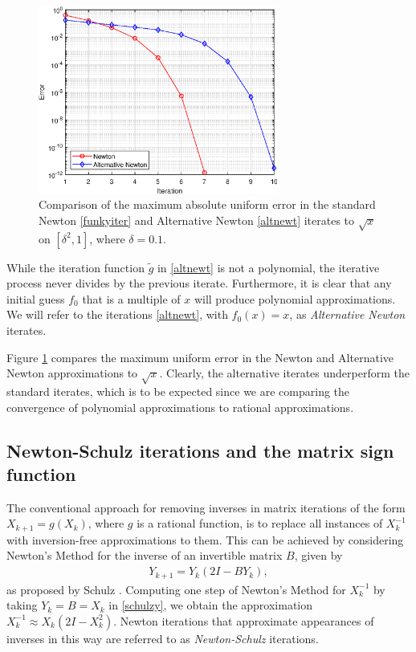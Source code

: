 \begin{figure}[t!]
\centering
   \includegraphics[width=0.7\textwidth,height=0.7\textheight,keepaspectratio]{figures/chapter_2/sqrt_newton_vs_alt.eps}
   \caption{Comparison of the maximum absolute uniform error in the standard Newton \eqref{funkyiter} and Alternative Newton \eqref{altnewt} iterates to $\sqrt{x}$ on $[\delta^2,1]$, where $\delta=0.1$.}
   \label{fig:sqrt_newt_vs_alt}
\end{figure}

\begin{rmk}
While the iteration function $\tilde{g}$ in \eqref{altnewt} is not a polynomial, the iterative process never divides by the previous iterate. Furthermore, it is clear that any initial guess $f_0$ that is a multiple of $x$ will produce polynomial approximations. We will refer to the iterations \eqref{altnewt}, with $f_0(x)=x$, as \textit{Alternative Newton} iterates. 
\end{rmk}

\newpage

Figure \ref{fig:sqrt_newt_vs_alt} compares the maximum uniform error in the Newton and Alternative Newton approximations to $\sqrt{x}$. Clearly, the alternative iterates underperform the standard iterates, which is to be expected since we are comparing the convergence of polynomial approximations to rational approximations. 

\subsection{Newton-Schulz iterations and the matrix sign function}

The conventional approach for removing inverses in matrix iterations of the form $X_{k+1}=g(X_k)$, where $g$ is a rational function, is to replace all instances of $X_k^{-1}$ with inversion-free approximations to them. This can be achieved by considering Newton's Method for the inverse of an invertible matrix $B$, given by
\begin{align}
    Y_{k+1}=Y_k(2I-BY_k), \label{schulzy}
\end{align}
as proposed by Schulz \cite{schulz}. Computing one step of Newton's Method for $X_k^{-1}$ by taking $Y_k = B = X_k$ in \eqref{schulzy}, we obtain the approximation $X_k^{-1} \approx X_k(2I-X_k^2)$. Newton iterations that approximate appearances of inverses in this way are referred to as \textit{Newton-Schulz} iterations. 

